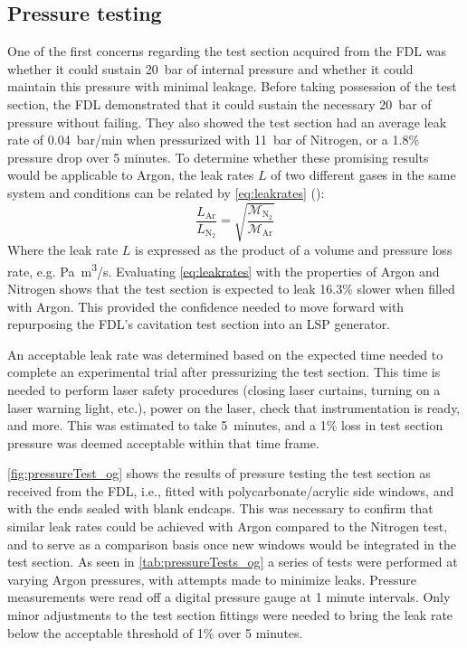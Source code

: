        \subsection{Pressure testing}
            One of the first concerns regarding the test section acquired from the FDL was whether it could sustain 20~bar of internal pressure and whether it could maintain this pressure with minimal leakage. Before taking possession of the test section, the FDL demonstrated that it could sustain the necessary \qty{20}{bar} of pressure without failing. They also showed the test section had an average leak rate of \qty{0.04}{bar/min} when pressurized with \qty{11}{bar} of Nitrogen, or a 1.8\% pressure drop over 5 minutes. To determine whether these promising results would be applicable to Argon, the leak rates $L$ of two different gases in the same system and conditions can be related by \autoref{eq:leakrates} (\textcite{greenhouseHermeticityElectronicPackages2012}):
            \begin{equation}
                \frac{L_\mathrm{Ar}}{L_{\mathrm{N}_2}} = \sqrt{\frac{\mathcal{M}_{\mathrm{N}_2}}{\mathcal{M}_\mathrm{Ar}}}
                \label{eq:leakrates}
            \end{equation}
            Where the leak rate $L$ is expressed as the product of a volume and pressure loss rate, e.g. \unit{Pa.m^3/s}. Evaluating \autoref{eq:leakrates} with the properties of Argon and Nitrogen shows that the test section is expected to leak 16.3\% slower when filled with Argon. This provided the confidence needed to move forward with repurposing the FDL's cavitation test section into an LSP generator.
            
            An acceptable leak rate was determined based on the expected time needed to complete an experimental trial after pressurizing the test section. This time is needed to perform laser safety procedures (closing laser curtains, turning on a laser warning light, etc.), power on the laser, check that instrumentation is ready, and more. This was estimated to take 5~minutes, and a 1\% loss in test section pressure was deemed acceptable within that time frame.

            \autoref{fig:pressureTest_og} shows the results of pressure testing the test section as received from the FDL, i.e., fitted with polycarbonate/acrylic side windows, and with the ends sealed with blank endcaps. This was necessary to confirm that similar leak rates could be achieved with Argon compared to the Nitrogen test, and to serve as a comparison basis once new windows would be integrated in the test section. As seen in \autoref{tab:pressureTests_og} a series of tests were performed at varying Argon pressures, with attempts made to minimize leaks. Pressure measurements were read off a digital pressure gauge at 1 minute intervals. Only minor adjustments to the test section fittings were needed to bring the leak rate below the acceptable threshold of 1\% over 5 minutes. 

